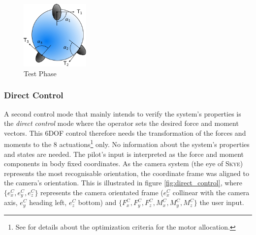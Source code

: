 \begin{figure}[H] %
	\begin{center}
		\includegraphics[width=0.3\textwidth]{TPC.pdf}
		\caption[Test Phase]{Test Phase}  
		\label{fig:test_phase}		
	\end{center}
\end{figure}


\subsubsection{Direct Control} 
A second control mode that mainly intends to verify the system's properties is the \textit{direct control} mode where the operator sets the desired force and moment vectors. This 6DOF control therefore needs the transformation of the forces and moments to the 8 actuations\footnote{See \cite{schaffnervu} for details about the optimization criteria for the motor allocation.} only. No information about the system's properties and states are needed. The pilot's input is interpreted as the force and moment components in body fixed coordinates. As the camera system (the eye of \textsc{Skye}) represents the most recognisable orientation, the coordinate frame was aligned to the camera's orientation. This is illustrated in figure \ref{fig:direct_control}, where $\{e_x^C, e_y^C, e_z^C\}$ represents the camera orientated frame ($e_x^C$ collinear with the camera axis, $e_y^C$ heading left, $e_z^C$ bottom) and $\{F_x^C, F_y^C, F_z^C, M_x^C, M_y^C, M_z^C\}$ the user input.


